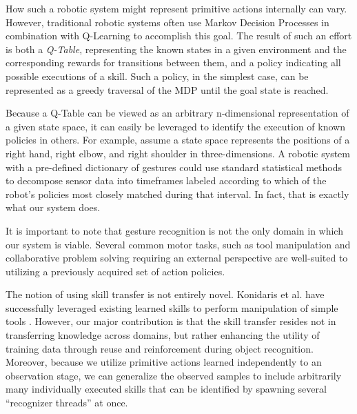 \documentclass[letterpaper]{article}
\begin{document}
How such a robotic system might represent primitive actions internally can vary.  However, traditional robotic systems often use Markov Decision Processes in combination with Q-Learning to accomplish this goal.  The result of such an effort is both a \textit{Q-Table}, representing the known states in a given environment and the corresponding rewards for transitions between them, and a policy indicating all possible executions of a skill.  Such a policy, in the simplest case, can be represented as a greedy traversal of the MDP until the goal state is reached.

Because a Q-Table can be viewed as an arbitrary n-dimensional representation of a given state space, it can easily be leveraged to identify the execution of known policies in others.  For example, assume a state space represents the positions of a right hand, right elbow, and right shoulder in three-dimensions.  A robotic system with a pre-defined dictionary of gestures could use standard statistical methods to decompose sensor data into timeframes labeled according to which of the robot's policies most closely matched during that interval.  In fact, that is exactly what our system does.

It is important to note that gesture recognition is not the only domain in which our system is viable.  Several common motor tasks, such as tool manipulation and collaborative problem solving requiring an external perspective \cite{HRITraftonPerspective} are well-suited to utilizing a previously acquired set of action policies.

The notion of using skill transfer is not entirely novel.  Konidaris et al. have successfully leveraged existing learned skills to perform manipulation of simple tools \cite{AutoSkillAcquisition}. However, our major contribution is that the skill transfer resides not in transferring knowledge across domains, but rather enhancing the utility of training data through reuse and reinforcement during object recognition. Moreover, because we utilize primitive actions learned independently to an observation stage, we can generalize the observed samples to include arbitrarily many individually executed skills that can be identified by spawning several ``recognizer threads'' at once.
\end{document}

